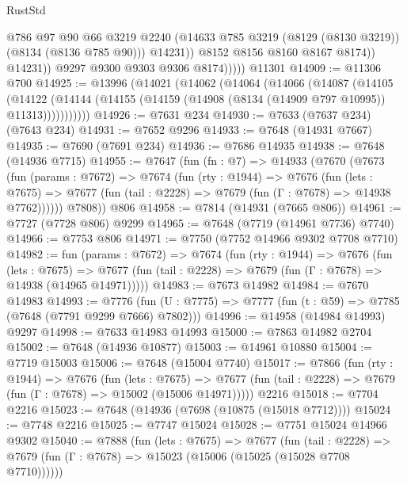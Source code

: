 \begin{lexlean}{RustStd}
\begin{coremodule}
{\begin{coremodule}
{{{{{{{{{{{{{{{{{{{{{{{{{{{{{{{{{{{{{{{{{{{{{{{{{{{{{                          @786
                          @97
                          @90
                          @66
                          @3219
                          @2240
                          (@14633 @785 @3219 (@8129 (@8130 @3219)) (@8134 (@8136 @785 @90)))
                          @14231))
                      @8152
                      @8156
                      @8160
                      @8167
                      @8174))
                  @14231))
              @9297
              @9300
              @9303
              @9306
              @8174)))))
    @11301
@14909 := @11306 @700
@14925 := @13996
    (@14021
      (@14062
        (@14064
          (@14066
            (@14087
              (@14105
                (@14122
                  (@14144 (@14155 (@14159 (@14908 (@8134 (@14909 @797 @10995)) @11313)))))))))))
@14926 := @7631 @234
@14930 := @7633 (@7637 @234) (@7643 @234)
@14931 := @7652 @9296
@14933 := @7648 (@14931 @7667)
@14935 := @7690 (@7691 @234)
@14936 := @7686 @14935
@14938 := @7648 (@14936 @7715)
@14955 := @7647
    (fun (fn : @7) =>
    @14933
      (@7670
        (@7673
          (fun (params : @7672) =>
          @7674
            (fun (rty : @1944) =>
            @7676
              (fun (lets : @7675) =>
              @7677 (fun (tail : @2228) => @7679 (fun (Γ : @7678) => @14938 @7762))))))
        @7808))
    @806
@14958 := @7814 (@14931 (@7665 @806))
@14961 := @7727 (@7728 @806) @9299
@14965 := @7648 (@7719 (@14961 @7736) @7740)
@14966 := @7753 @806
@14971 := @7750 (@7752 @14966 @9302 @7708 @7710)
@14982 := fun (params : @7672) =>
  @7674
    (fun (rty : @1944) =>
    @7676
      (fun (lets : @7675) =>
      @7677 (fun (tail : @2228) => @7679 (fun (Γ : @7678) => @14938 (@14965 @14971)))))
@14983 := @7673 @14982
@14984 := @7670 @14983
@14993 := @7776
    (fun (U : @7775) => @7777 (fun (t : @59) => @7785 (@7648 (@7791 @9299 @7666) @7802)))
@14996 := @14958 (@14984 @14993) @9297
@14998 := @7633 @14983 @14993
@15000 := @7863 @14982 @2704
@15002 := @7648 (@14936 @10877)
@15003 := @14961 @10880
@15004 := @7719 @15003
@15006 := @7648 (@15004 @7740)
@15017 := @7866
    (fun (rty : @1944) =>
    @7676
      (fun (lets : @7675) =>
      @7677 (fun (tail : @2228) => @7679 (fun (Γ : @7678) => @15002 (@15006 @14971)))))
    @2216
@15018 := @7704 @2216
@15023 := @7648 (@14936 (@7698 (@10875 (@15018 @7712))))
@15024 := @7748 @2216
@15025 := @7747 @15024
@15028 := @7751 @15024 @14966 @9302
@15040 := @7888
    (fun (lets : @7675) =>
    @7677
      (fun (tail : @2228) =>
      @7679 (fun (Γ : @7678) => @15023 (@15006 (@15025 (@15028 @7708 @7710))))))
}}}}}}}}}}}}}}}}}}}}}}}}}}}}}}}}}}}}}}}}}}}}}}}}}}}}}
\end{coremodule}}
\end{coremodule}
\end{lexlean}
